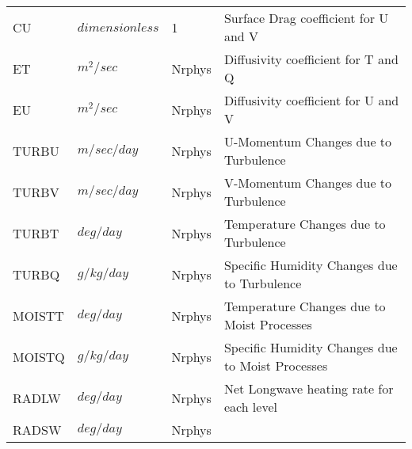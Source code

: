 \begin{tabular}{llll}
 CU       & $dimensionless$ &  1 
     &\begin{minipage}[t]{3in}
      {Surface Drag coefficient for U and V}
     \end{minipage}\\
 ET       &  $m^2/sec$ &  Nrphys
     &\begin{minipage}[t]{3in}
      {Diffusivity coefficient for T and Q}
     \end{minipage}\\
 EU       &  $m^2/sec$ &  Nrphys
     &\begin{minipage}[t]{3in}
      {Diffusivity coefficient for U and V}
     \end{minipage}\\
 TURBU    &  $m/sec/day$ &  Nrphys 
     &\begin{minipage}[t]{3in}
      {U-Momentum Changes due to Turbulence}
     \end{minipage}\\
 TURBV    &  $m/sec/day$ &  Nrphys 
     &\begin{minipage}[t]{3in}
      {V-Momentum Changes due to Turbulence}
     \end{minipage}\\
 TURBT    &  $deg/day$ &  Nrphys 
     &\begin{minipage}[t]{3in}
      {Temperature Changes due to Turbulence}
     \end{minipage}\\
 TURBQ    &  $g/kg/day$ &  Nrphys 
     &\begin{minipage}[t]{3in}
      {Specific Humidity Changes due to Turbulence}
     \end{minipage}\\
 MOISTT   &   $deg/day$ &  Nrphys 
     &\begin{minipage}[t]{3in}
      {Temperature Changes due to Moist Processes}
     \end{minipage}\\
 MOISTQ   &  $g/kg/day$ &  Nrphys 
     &\begin{minipage}[t]{3in}
      {Specific Humidity Changes due to Moist Processes}
     \end{minipage}\\
 RADLW    &  $deg/day$ &  Nrphys 
     &\begin{minipage}[t]{3in}
      {Net Longwave heating rate for each level}
     \end{minipage}\\
 RADSW    &  $deg/day$ &  Nrphys 
     &\begin{minipage}[t]{3in}

\end{minipage}
\end{tabular}
